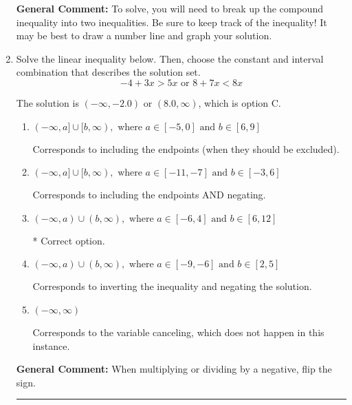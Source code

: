 \documentclass{extbook}[14pt]
\newcommand{\litem}[1]{\item #1

\rule{\textwidth}{0.4pt}}
\begin{document}
\begin{enumerate}
{\textbf{General Comment:} To solve, you will need to break up the compound inequality into two inequalities. Be sure to keep track of the inequality! It may be best to draw a number line and graph your solution.
}
\litem{
Solve the linear inequality below. Then, choose the constant and interval combination that describes the solution set.
\[ -4 + 3 x > 5 x \text{ or } 8 + 7 x < 8 x \]

The solution is \( (-\infty, -2.0) \text{ or } (8.0, \infty) \), which is option C.\begin{enumerate}[label=\Alph*.]
\item \( (-\infty, a] \cup [b, \infty), \text{ where } a \in [-5, 0] \text{ and } b \in [6, 9] \)

Corresponds to including the endpoints (when they should be excluded).
\item \( (-\infty, a] \cup [b, \infty), \text{ where } a \in [-11, -7] \text{ and } b \in [-3, 6] \)

Corresponds to including the endpoints AND negating.
\item \( (-\infty, a) \cup (b, \infty), \text{ where } a \in [-6, 4] \text{ and } b \in [6, 12] \)

 * Correct option.
\item \( (-\infty, a) \cup (b, \infty), \text{ where } a \in [-9, -6] \text{ and } b \in [2, 5] \)

Corresponds to inverting the inequality and negating the solution.
\item \( (-\infty, \infty) \)

Corresponds to the variable canceling, which does not happen in this instance.
\end{enumerate}

\textbf{General Comment:} When multiplying or dividing by a negative, flip the sign.
}
\end{enumerate}
\end{document}
